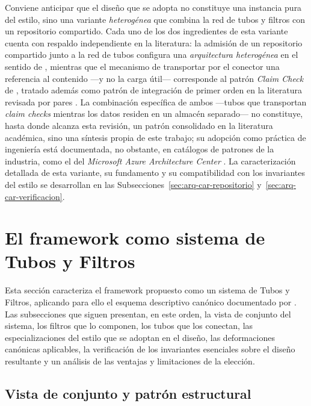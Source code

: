 \documentclass[12pt]{report}
\begin{document}
Conviene anticipar que el diseño que se adopta no constituye una instancia pura del estilo, sino una variante \textit{heterogénea} que combina la red de tubos y filtros con un repositorio compartido. Cada uno de los dos ingredientes de esta variante cuenta con respaldo independiente en la literatura: la admisión de un repositorio compartido junto a la red de tubos configura una \textit{arquitectura heterogénea} en el sentido de \citet{garlanshaw:1994}, mientras que el mecanismo de transportar por el conector una referencia al contenido ---y no la carga útil--- corresponde al patrón \textit{Claim Check} de \citet{hohpe:2003}, tratado además como patrón de integración de primer orden en la literatura revisada por pares \citep{ritter:2014}. La combinación específica de ambos ---tubos que transportan \textit{claim checks} mientras los datos residen en un almacén separado--- no constituye, hasta donde alcanza esta revisión, un patrón consolidado en la literatura académica, sino una síntesis propia de este trabajo; su adopción como práctica de ingeniería está documentada, no obstante, en catálogos de patrones de la industria, como el del \textit{Microsoft Azure Architecture Center} \citep{azure-pipesfilters}. La caracterización detallada de esta variante, su fundamento y su compatibilidad con los invariantes del estilo se desarrollan en las Subsecciones~\ref{sec:arq-car-repositorio} y~\ref{sec:arq-car-verificacion}.

\section{El framework como sistema de Tubos y Filtros}
\label{sec:arq-caracterizacion}

Esta sección caracteriza el framework propuesto como un sistema de Tubos y Filtros, aplicando para ello el esquema descriptivo canónico documentado por \citet{cristia:2025}. Las subsecciones que siguen presentan, en este orden, la vista de conjunto del sistema, los filtros que lo componen, los tubos que los conectan, las especializaciones del estilo que se adoptan en el diseño, las deformaciones canónicas aplicables, la verificación de los invariantes esenciales sobre el diseño resultante y un análisis de las ventajas y limitaciones de la elección.

\subsection{Vista de conjunto y patrón estructural}
\label{sec:arq-car-conjunto}
\end{document}
